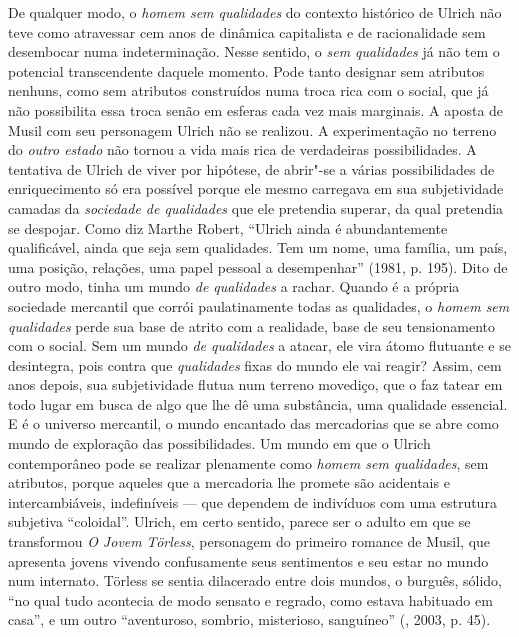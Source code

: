 De qualquer modo, o \emph{homem sem qualidades} do contexto histórico de
Ulrich não teve como atravessar cem anos de dinâmica capitalista e de
racionalidade sem desembocar numa indeterminação. Nesse sentido, o
\emph{sem qualidades} já não tem o potencial transcendente daquele
momento. Pode tanto designar sem atributos nenhuns, como sem atributos
construídos numa troca rica com o social, que já não possibilita essa
troca senão em esferas cada vez mais marginais. A aposta de Musil com
seu personagem Ulrich não se realizou. A experimentação no terreno do
\emph{outro estado} não tornou a vida mais rica de verdadeiras
possibilidades. A tentativa de Ulrich de viver por hipótese, de abrir"-se
a várias possibilidades de enriquecimento só era possível porque ele
mesmo carregava em sua subjetividade camadas da \emph{sociedade de
qualidades} que ele pretendia superar, da qual pretendia se despojar.
Como diz Marthe Robert, ``Ulrich ainda é abundantemente qualificável,
ainda que seja sem qualidades. Tem um nome, uma família, um país, uma
posição, relações, uma papel pessoal a desempenhar'' (1981, p. 195).
Dito de outro modo, tinha um mundo \emph{de qualidades} a rachar. Quando
é a própria sociedade mercantil que corrói paulatinamente todas as
qualidades, o \emph{homem sem qualidades} perde sua base de atrito com a
realidade, base de seu tensionamento com o social. Sem um mundo \emph{de
qualidades} a atacar, ele vira átomo flutuante e se desintegra, pois
contra que \emph{qualidades} fixas do mundo ele vai reagir? Assim, cem
anos depois, sua subjetividade flutua num terreno movediço, que o faz
tatear em todo lugar em busca de algo que lhe dê uma substância, uma
qualidade essencial. E é o universo mercantil, o mundo encantado das
mercadorias que se abre como mundo de exploração das possibilidades. Um
mundo em que o Ulrich contemporâneo pode se realizar plenamente como
\emph{homem sem qualidades}, sem atributos, porque aqueles que a
mercadoria lhe promete são acidentais e intercambiáveis, indefiníveis
--- que dependem de indivíduos com uma estrutura subjetiva ``coloidal''.
Ulrich, em certo sentido, parece ser o adulto em que se transformou
\emph{O Jovem} \emph{Törless}, personagem do primeiro romance de Musil,
que apresenta jovens vivendo confusamente seus sentimentos e seu estar
no mundo num internato. Törless se sentia dilacerado entre dois mundos,
o burguês, sólido, ``no qual tudo acontecia de modo sensato e regrado,
como estava habituado em casa'', e um outro ``aventuroso, sombrio,
misterioso, sanguíneo'' (, 2003, p. 45).

